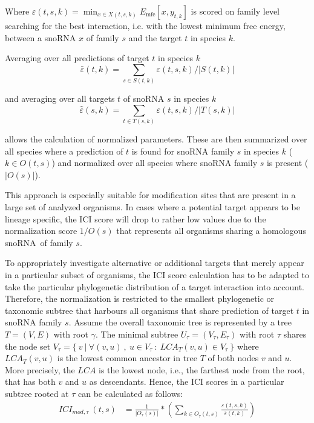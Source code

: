 \documentclass[preprint,3p,times,twocolumn]{elsarticle}
\newcommand{\sno}{snoRNA}
\begin{document}
Where
$ \varepsilon(t,s,k) = \min_{x\in X(t,s,k)} E_{\textrm{mfe}}[x,y_{t,k}] $
is scored on family level searching for the best interaction, i.e. with the lowest minimum free energy, between a snoRNA $x$ of family $s$ and the target $t$ in species $k$.

Averaging over all predictions of target $t$ in
species $k$
\begin{equation}
\bar\varepsilon(t,k)=\sum_{s\in
  S(t,k)}\varepsilon(t,s,k)/|S(t,k)|
\end{equation}

and averaging over all targets $t$ of snoRNA $s$ in species $k$
\begin{equation}
\hat\varepsilon(s,k)=\sum_{t\in
  T(s,k)}\varepsilon(t,s,k)/|T(s,k)|
\end{equation}

allows the calculation of normalized
parameters. These are then summarized over all species where a prediction of $t$ is found for snoRNA family $s$ in species $k$ ($k\in O(t,s) $) and normalized over all species where snoRNA family $s$ is present ($|O(s)|$).


This approach is especially suitable for modification
sites that are present in a large set of analyzed organisms. In cases
where a potential target appears to be lineage specific, the ICI score
will drop to rather low values due to the normalization score $1/O(s)$
that represents all organisms sharing a homologous \sno\ of family
$s$.

To appropriately investigate alternative or additional targets that
merely appear in a particular subset of organisms, the ICI score
calculation has to be adapted to take the particular phylogenetic
distribution of a target interaction into account. Therefore, the
normalization is restricted to the smallest phylogenetic or taxonomic subtree that
harbours all organisms that share prediction of target $t$ in snoRNA family $s$.
Assume the overall  taxonomic tree is
represented by a tree $T=(V,E)$ with root $\gamma$. The minimal subtree
$U_\tau = (V_\tau, E_\tau)$ with root $\tau$ shares the node set
$V_\tau = \{\  v\  |\  \forall (v,u)\ ,\  u \in V_\tau\  :\
LCA_T(v,u) \in V_\tau\  \}$ where $LCA_T(v,u)$ is the lowest common ancestor in tree $T$
of both nodes $v$ and $u$. More precisely, the $LCA$ is the lowest node,
i.e., the farthest node from the root, that has both $v$ and $u$ as
descendants.
Hence, the ICI scores in a particular subtree rooted at $\tau$ can be
calculated as follows:
\begin{equation}
  \begin{split}
    ICI_{mod,\tau}\:(t,s) & = \frac{1}{|O_\tau(s)|} * \left( \sum_{k\in O_\tau(t,s)} \frac{\varepsilon(t,s,k)}{\bar\varepsilon(t,k)} \right)
  \end{split}
\end{equation}
\end{document}
